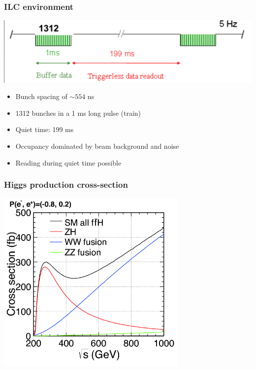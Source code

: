 \documentclass{beamer}
\begin{document}
  \begin{frame}[plain]
    \frametitle{ILC environment}

    \begin{center}
    \includegraphics[width = \textwidth]{Pictures/bunchTrainILC.png}
    \end{center}

    \begin{itemize}
      \item Bunch spacing of $\sim 554$ ns
      \item 1312 bunches in a 1 ms long pulse (train)
      \item Quiet time: 199 ms
      \item Occupancy dominated by beam background and noise
      \item Reading during quiet time possible
    \end{itemize}

  \end{frame}

\begin{frame}[plain,label=Xsec]
  \frametitle{Higgs production cross-section}

  \begin{center}
    \includegraphics[width = 0.7\textwidth]{Pictures/higgs_xsec_P-8_3.png}
  \end{center}
\end{frame}
\end{document}
